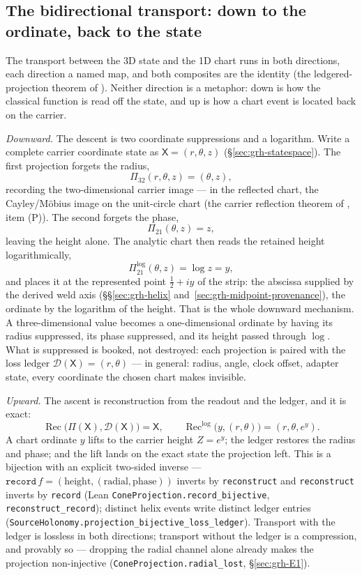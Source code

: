 \documentclass[11pt]{article}
\theoremstyle{definition}
\begin{document}
\subsection{The bidirectional transport: down to the ordinate, back to the
state}\label{sec:grh-projection}

The transport between the 3D state and the 1D chart runs in both directions,
each direction a named map, and both composites are the identity
(the ledgered-projection theorem of \cite{UniversalCarrier}). Neither
direction is a metaphor:
down is how the classical function is read off the state, and up is how a
chart event is located back on the carrier.

\emph{Downward.} The descent is two coordinate suppressions and a logarithm.
Write a complete carrier coordinate state as \(\mathsf X=(r,\theta,z)\)
(\S\ref{sec:grh-statespace}). The first projection forgets the radius,
\[
\Pi_{32}(r,\theta,z)=(\theta,z),
\]
recording the two-dimensional carrier image --- in the reflected chart, the
Cayley/M\"obius image on the unit-circle chart
(the carrier reflection theorem of \cite{UniversalCarrier}, item (P)). The
second forgets the
phase,
\[
\Pi_{21}(\theta,z)=z,
\]
leaving the height alone. The analytic chart then reads the retained height
logarithmically,
\[
\Pi^{\log}_{21}(\theta,z)=\log z=y,
\]
and places it at the represented point \(\tfrac12+iy\) of the strip: the
abscissa supplied by the derived weld axis
(\S\S\ref{sec:grh-helix} and~\ref{sec:grh-midpoint-provenance}), the
ordinate by the logarithm of the height. That is
the whole downward mechanism. A three-dimensional value becomes a
one-dimensional ordinate by having its radius suppressed, its phase
suppressed, and its height passed through \(\log\). What is suppressed is
booked, not destroyed: each projection is paired with the loss ledger
\(\mathcal D(\mathsf X)=(r,\theta)\) --- in general: radius, angle, clock
offset, adapter state, every coordinate the chosen chart makes invisible.

\emph{Upward.} The ascent is reconstruction from the readout and the ledger,
and it is exact:
\[
\operatorname{Rec}\bigl(\Pi(\mathsf X),\mathcal D(\mathsf X)\bigr)=\mathsf X,
\qquad
\operatorname{Rec}^{\log}\bigl(y,(r,\theta)\bigr)=(r,\theta,e^{y}).
\]
A chart ordinate \(y\) lifts to the carrier height \(Z=e^{y}\); the ledger
restores the radius and phase; and the lift lands on the exact state the
projection left. This is a bijection with an explicit two-sided inverse ---
\(\texttt{record}\,f=(\text{height},(\text{radial},\text{phase}))\) inverts
by \texttt{reconstruct} and \texttt{reconstruct} inverts by \texttt{record}
(Lean \texttt{ConeProjection.record\_bijective}, \texttt{reconstruct\_record});
distinct helix events write distinct ledger entries
(\texttt{SourceHolonomy.projection\_bijective\_loss\_ledger}). Transport with
the ledger is lossless in both directions; transport without the ledger is a
compression, and provably so --- dropping the radial channel alone already
makes the projection non-injective (\texttt{ConeProjection.radial\_lost},
\S\ref{sec:grh-E1}).
\end{document}
